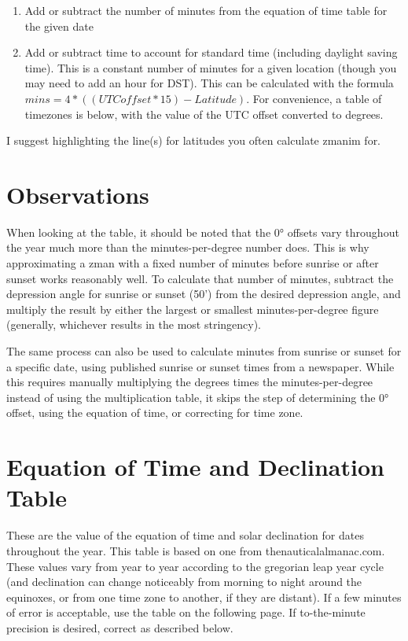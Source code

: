 \begin{enumerate}
	\item Add or subtract the number of minutes from the equation of time table for the given date
	\item Add or subtract time to account for standard time (including daylight saving time). This is a constant number of minutes for a given location (though you may need to add an hour for DST). This can be calculated with the formula $mins = 4 * \left(\left(UTCoffset * 15\right) - Latitude\right)$.  For convenience, a table of timezones is below, with the value of the UTC offset converted to degrees.
\end{enumerate}

I suggest highlighting the line(s) for latitudes you often calculate zmanim for.

\section{Observations}

When looking at the table, it should be noted that the 0° offsets vary throughout the year much more than the minutes-per-degree number does. This is why approximating a zman with a fixed number of minutes before sunrise or after sunset works reasonably well. To calculate that number of minutes, subtract the depression angle for sunrise or sunset (50') from the desired depression angle, and multiply the result by either the largest or smallest minutes-per-degree figure (generally, whichever results in the most stringency).

The same process can also be used to calculate minutes from sunrise or sunset for a specific date, using published sunrise or sunset times from a newspaper. While this requires manually multiplying the degrees times the minutes-per-degree instead of using the multiplication table, it skips the step of determining the 0° offset, using the equation of time, or correcting for time zone.\vfill

\section{Equation of Time and Declination Table}

These are the value of the equation of time and solar declination for dates throughout the year. This table is based on one from thenauticalalmanac.com. These values vary from year to year according to the gregorian leap year cycle (and declination can change noticeably from morning to night around the equinoxes, or from one time zone to another, if they are distant). If a few minutes of error is acceptable, use the table on the following page.  If to-the-minute precision is desired, correct as described below.

